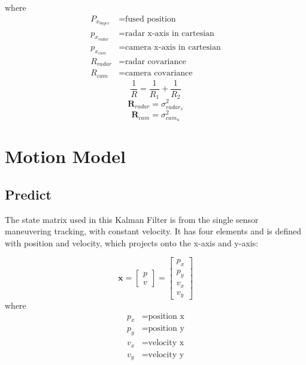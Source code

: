 where
\begin{align*}
    P_{x_{bayes}} &= \text{fused position}\\
    p_{x_{radar}} &= \text{radar x-axis in cartesian}\\
    p_{x_{cam}} &= \text{camera x-axis in cartesian}\\
    R_{radar} &= \text{radar covariance}\\
    R_{cam} &= \text{camera covariance}
\end{align*}
\begin{equation}\label{equ:bayes4}
    \frac{1}{R}=\frac{1}{R_1}+\frac{1}{R_2}
\end{equation}
\begin{equation}\label{equ:2-radar_R}
    \mathbf{R}_{radar} = 
        \sigma_{radar_x}^2 
\end{equation}
\begin{equation}\label{equ:2-R_cam}
    \mathbf{R}_{cam} = 
        \sigma_{cam_u}^2
\end{equation}


\section{Motion Model}\label{sec:2-kalman_filter}

\subsection{Predict}\label{sec:2-predict}
The state matrix used in this Kalman Filter is from the single sensor maneuvering tracking, with constant velocity.
It has four elements and is defined with position and velocity, which projects onto the x-axis and y-axis:

\begin{equation}\label{equ:state_eq}
    \mathbf{x} = 
        \begin{bmatrix} 
        p \\ 
        v 
        \end{bmatrix} = 
        \begin{bmatrix} 
        p_x \\ 
        p_y \\ 
        v_x \\ 
        v_y 
        \end{bmatrix}
\end{equation}
where
\begin{align*}
    p_x &=\text{position x}\\
    p_y &=\text{position y}\\
    v_x &=\text{velocity x}\\
    v_y &=\text{velocity y}\\
\end{align*}

